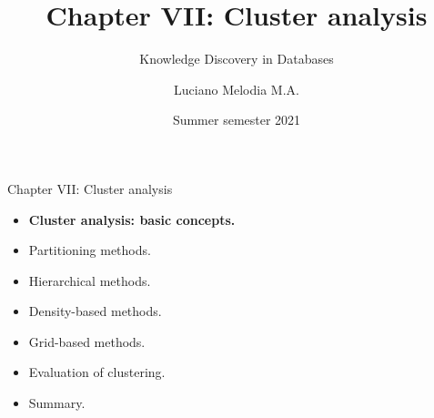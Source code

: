 \documentclass[aspectratio=169,t,xcolor=dvipsnames]{beamer}
\title[KDD]{Chapter VII: Cluster analysis}
\subtitle{Knowledge Discovery in Databases}
\author[L.~Melodia]{Luciano Melodia M.A.}
\institute[Department]{Evolutionary Data Management, Friedrich-Alexander University Erlangen-Nürnberg}
\date{Summer semester 2021}
\begin{document}
  \maketitle

  {
    \begin{frame}{Chapter VII: Cluster analysis}
        \begin{itemize}
            \item \textbf{Cluster analysis: basic concepts.}
            \item Partitioning methods.
            \item Hierarchical methods.
            \item Density-based methods.
            \item Grid-based methods.
            \item Evaluation of clustering.
            \item Summary.
        \end{itemize}
    \end{frame}
  }
\end{document}
